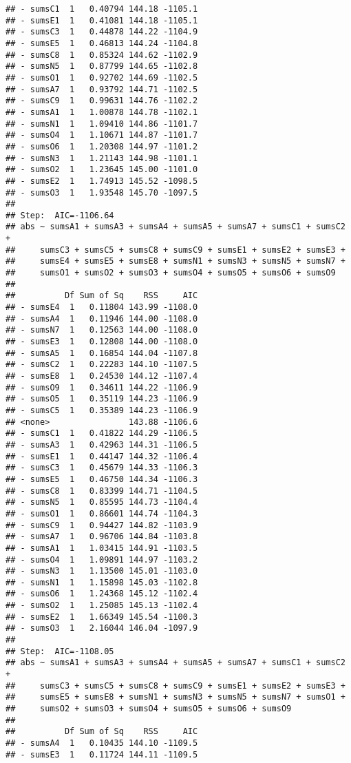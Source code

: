 \documentclass[,man,floatsintext]{apa6}
\begin{document}
\begin{verbatim}
## - sumsC1  1   0.40794 144.18 -1105.1
## - sumsE1  1   0.41081 144.18 -1105.1
## - sumsC3  1   0.44878 144.22 -1104.9
## - sumsE5  1   0.46813 144.24 -1104.8
## - sumsC8  1   0.85324 144.62 -1102.9
## - sumsN5  1   0.87799 144.65 -1102.8
## - sumsO1  1   0.92702 144.69 -1102.5
## - sumsA7  1   0.93792 144.71 -1102.5
## - sumsC9  1   0.99631 144.76 -1102.2
## - sumsA1  1   1.00878 144.78 -1102.1
## - sumsN1  1   1.09410 144.86 -1101.7
## - sumsO4  1   1.10671 144.87 -1101.7
## - sumsO6  1   1.20308 144.97 -1101.2
## - sumsN3  1   1.21143 144.98 -1101.1
## - sumsO2  1   1.23645 145.00 -1101.0
## - sumsE2  1   1.74913 145.52 -1098.5
## - sumsO3  1   1.93548 145.70 -1097.5
## 
## Step:  AIC=-1106.64
## abs ~ sumsA1 + sumsA3 + sumsA4 + sumsA5 + sumsA7 + sumsC1 + sumsC2 + 
##     sumsC3 + sumsC5 + sumsC8 + sumsC9 + sumsE1 + sumsE2 + sumsE3 + 
##     sumsE4 + sumsE5 + sumsE8 + sumsN1 + sumsN3 + sumsN5 + sumsN7 + 
##     sumsO1 + sumsO2 + sumsO3 + sumsO4 + sumsO5 + sumsO6 + sumsO9
## 
##          Df Sum of Sq    RSS     AIC
## - sumsE4  1   0.11804 143.99 -1108.0
## - sumsA4  1   0.11946 144.00 -1108.0
## - sumsN7  1   0.12563 144.00 -1108.0
## - sumsE3  1   0.12808 144.00 -1108.0
## - sumsA5  1   0.16854 144.04 -1107.8
## - sumsC2  1   0.22283 144.10 -1107.5
## - sumsE8  1   0.24530 144.12 -1107.4
## - sumsO9  1   0.34611 144.22 -1106.9
## - sumsO5  1   0.35119 144.23 -1106.9
## - sumsC5  1   0.35389 144.23 -1106.9
## <none>                143.88 -1106.6
## - sumsC1  1   0.41822 144.29 -1106.5
## - sumsA3  1   0.42963 144.31 -1106.5
## - sumsE1  1   0.44147 144.32 -1106.4
## - sumsC3  1   0.45679 144.33 -1106.3
## - sumsE5  1   0.46750 144.34 -1106.3
## - sumsC8  1   0.83399 144.71 -1104.5
## - sumsN5  1   0.85595 144.73 -1104.4
## - sumsO1  1   0.86601 144.74 -1104.3
## - sumsC9  1   0.94427 144.82 -1103.9
## - sumsA7  1   0.96706 144.84 -1103.8
## - sumsA1  1   1.03415 144.91 -1103.5
## - sumsO4  1   1.09891 144.97 -1103.2
## - sumsN3  1   1.13500 145.01 -1103.0
## - sumsN1  1   1.15898 145.03 -1102.8
## - sumsO6  1   1.24368 145.12 -1102.4
## - sumsO2  1   1.25085 145.13 -1102.4
## - sumsE2  1   1.66349 145.54 -1100.3
## - sumsO3  1   2.16044 146.04 -1097.9
## 
## Step:  AIC=-1108.05
## abs ~ sumsA1 + sumsA3 + sumsA4 + sumsA5 + sumsA7 + sumsC1 + sumsC2 + 
##     sumsC3 + sumsC5 + sumsC8 + sumsC9 + sumsE1 + sumsE2 + sumsE3 + 
##     sumsE5 + sumsE8 + sumsN1 + sumsN3 + sumsN5 + sumsN7 + sumsO1 + 
##     sumsO2 + sumsO3 + sumsO4 + sumsO5 + sumsO6 + sumsO9
## 
##          Df Sum of Sq    RSS     AIC
## - sumsA4  1   0.10435 144.10 -1109.5
## - sumsE3  1   0.11724 144.11 -1109.5

\end{verbatim}
\end{document}
